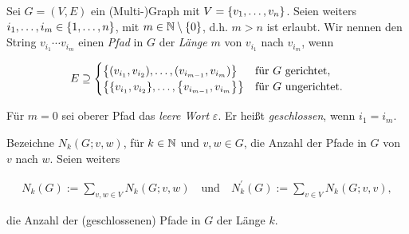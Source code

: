         \begin{definition} \label{def:path}

            Sei $G = (V, E)$ ein (Multi-)Graph mit $V = {\left \{ v_1, \dots, v_n \right \}}$.
            Seien weiters $i_1, \dots, i_m \in {\left \{ 1, \dots, n \right \}}$, mit $m \in \mathbb N \setminus {\left \{ 0 \right \}}$, d.h. $m > n$ ist erlaubt.
            Wir nennen den String $v_{i_1} \cdots v_{i_m}$ einen \textit{Pfad} in $G$ der \textit{Länge} $m$ von $v_{i_1}$ nach $v_{i_m}$, wenn

            \begin{align*}
                E
                \supseteq
                \begin{cases}
                    {\left \{ (v_{i_1}, v_{i_2}), \dots, (v_{i_{m-1}}, v_{i_m}) \right \}}
                    & \text{für} ~ G ~ \text{gerichtet}, \\
                    {\left \{ 
                        {\left \{ v_{i_1}, v_{i_2} \right \}},
                        \dots,
                        {\left \{ v_{i_{m-1}}, v_{i_m} \right \}}
                     \right \}}
                    & \text{für} ~ G ~ \text{ungerichtet}.
                \end{cases}
            \end{align*}

            Für $m = 0$ sei oberer Pfad das \textit{leere Wort} $\varepsilon$.
            Er heißt \textit{geschlossen}, wenn $i_1 = i_m$.

            Bezeichne $N_k(G; v, w)$, für $k \in \mathbb N$ und $v, w \in G$, die Anzahl der Pfade in $G$ von $v$ nach $w$.
            Seien weiters

            \begin{align*}
                N_k(G) := \sum_{v, w \in V} N_k(G; v, w)
                \quad
                \text{und}
                \quad
                N_k^\prime(G) := \sum_{v \in V} N_k(G; v, v),
            \end{align*}

            die Anzahl der (geschlossenen) Pfade in $G$ der Länge $k$.

        \end{definition}

